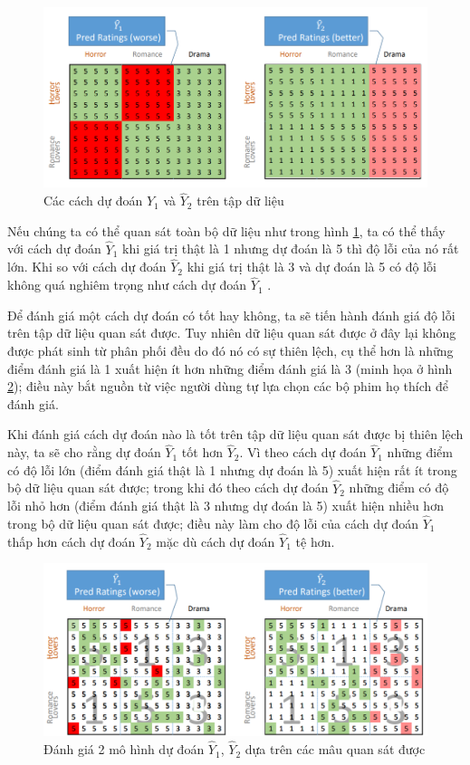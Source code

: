 \begin{figure}[h]
    \centering
    \includegraphics[width=\textwidth]{images/Chapter1/example_bias_2.png}
    \caption{Các cách dự đoán $\hat{Y}_1$ và $\hat{Y}_2$ trên tập dữ liệu}
    \label{fig:chap1_ex_2}
\end{figure}

Nếu chúng ta có thể quan sát toàn bộ dữ liệu như trong hình \ref{fig:chap1_ex_2}, ta có thể thấy với cách dự đoán $\hat{Y}_1$ khi giá trị thật là 1 nhưng dự đoán là 5 thì độ lỗi của nó rất lớn. Khi so với cách dự đoán $\hat{Y}_2$ khi giá trị thật là 3 và dự đoán là 5 có độ lỗi không quá nghiêm trọng như cách dự đoán $\hat{Y}_1$ .

Để đánh giá một cách dự đoán có tốt hay không, ta sẽ tiến hành đánh giá độ lỗi trên tập dữ liệu quan sát được. Tuy nhiên dữ liệu quan sát được ở đây lại không được phát sinh từ phân phối đều do đó nó có sự thiên lệch, cụ thể hơn là những điểm đánh giá là 1 xuất hiện ít hơn những điểm đánh giá là 3 (minh họa ở hình \ref{fig:chap1_ex_3}); điều này bắt nguồn từ việc người dùng tự lựa chọn các bộ phim họ thích để đánh giá.

Khi đánh giá cách dự đoán nào là tốt trên tập dữ liệu quan sát được bị thiên lệch này, ta sẽ cho rằng dự đoán $\hat{Y}_1$ tốt hơn $\hat{Y}_2$. Vì theo cách dự đoán $\hat{Y}_1$ những điểm có độ lỗi lớn (điểm đánh giá thật là 1 nhưng dự đoán là 5) xuất hiện rất ít trong bộ dữ liệu quan sát được; trong khi đó theo cách dự đoán $\hat{Y}_2$ những điểm có độ lỗi nhỏ hơn (điểm đánh giá thật là 3 nhưng dự đoán là 5) xuất hiện nhiều hơn trong bộ dữ liệu quan sát được; điều này làm cho độ lỗi của cách dự đoán $\hat{Y}_1$ thấp hơn cách dự đoán $\hat{Y}_2$ mặc dù cách dự đoán $\hat{Y}_1$ tệ hơn. 

\begin{figure}[h]
    \centering
    \includegraphics[width=\textwidth]{images/Chapter1/example_bias_3.png}
    \caption{Đánh giá 2 mô hình dự đoán $\hat{Y}_1$, $\hat{Y}_2$ dựa trên các mâu quan sát được }
    \label{fig:chap1_ex_3}
\end{figure}

